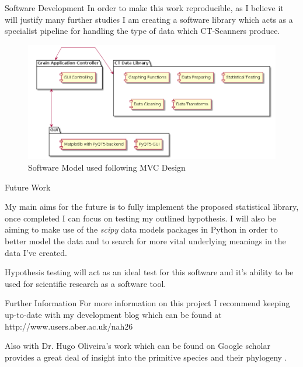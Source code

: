 \documentclass[final]{beamer}
\begin{document}
\begin{frame}{}
\begin{textblock}{27.7}
    \begin{block}{Software Development}
      In order to make this work reproducible, as I believe it will justify many further studies
      I am creating a software library which acts as a specialist pipeline for handling the type of data
      which CT-Scanners produce.
        \begin{figure}[htb]
          \centering
          \includegraphics[width=23cm]{mvc.png}
          \caption{\label{fig:mvc} Software Model used following MVC Design}
        \end{figure}        
    \end{block}

    \begin{block}{Future Work}

      My main aims for the future is to fully implement the proposed statistical library,
      once completed I can focus on testing my outlined hypothesis.
      I will also be aiming to make use of the \textit{scipy}
      data models packages in Python in order to better model the data and to search for more vital
      underlying meanings in the data I've created.

      Hypothesis testing will act as an ideal test for this software and it's ability to be used
      for scientific research as a software tool.

    \end{block}

    
    \begin{block}{Further Information}
      For more information on this project I recommend keeping up-to-date with my development blog
      which can be found at  http://www.users.aber.ac.uk/nah26

      Also with Dr. Hugo Oliveira's work which can be found on Google scholar
      provides a great deal of insight into the primitive species
      and their phylogeny \cite{Oliveira2012}. 
      

\end{block}
\end{textblock}
\end{frame}
\end{document}
